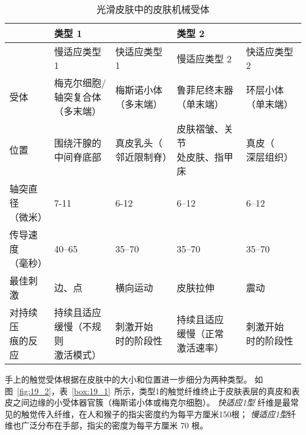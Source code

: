 \begin{table}[htbp]
	\caption{光滑皮肤中的皮肤机械受体} \label{tab:19_1} \centering
	\begin{tabular}{lllll}
		\toprule
		 & 类型 1 &  & 类型 2 & \\
		 \toprule
		 & 慢适应类型 1 & 快适应类型 1  & 慢适应类型 2 & 快适应类型 2 \\
		\midrule
		受体 & \makecell[l]{梅克尔细胞/\\轴突复合体\\（多末端）} & \makecell[l]{梅斯诺小体\\（多末端）} & \makecell[l]{鲁菲尼终末器\\（单末端）} & \makecell[l]{环层小体\\（单末端）} \\
		位置 & \makecell[l]{围绕汗腺的\\中间脊底部} & \makecell[l]{真皮乳头（\\邻近限制脊）} & \makecell[l]{皮肤褶皱、关节\\处皮肤、指甲床} & \makecell[l]{真皮（\\深层组织）} \\
		\makecell[l]{轴突直径\\（微米）} & 7-11 & 6-12 & 6–12 & 6–12 \\
		\makecell[l]{传导速度\\（毫秒）} & 40–65 & 35–70 & 35–70 & 35–70 \\
		最佳刺激 & 边、点 & 横向运动 & 皮肤拉伸 & 震动 \\
		\makecell[l]{对持续压\\痕的反应} & \makecell[l]{持续且适应\\缓慢（不规则\\激活模式）} & \makecell[l]{刺激开始\\时的阶段性} & \makecell{持续且适应\\缓慢（正常\\激活速率）} & \makecell[l]{刺激开始\\时的阶段性} \\
		\bottomrule
	\end{tabular}
\end{table}


手上的触觉受体根据在皮肤中的大小和位置进一步细分为两种类型。
如图~\ref{fig:19_2}，表~\ref{box:19_1}~所示，类型1的触觉纤维终止于皮肤表层的真皮和表皮之间边缘的小受体器官簇（梅斯诺小体或梅克尔细胞）。
\textit{快适应1型} 纤维是最常见的触觉传入纤维，在人和猴子的指尖密度约为每平方厘米150根；
\textit{慢适应1型}纤维也广泛分布在手部，指尖的密度为每平方厘米 70 根。


